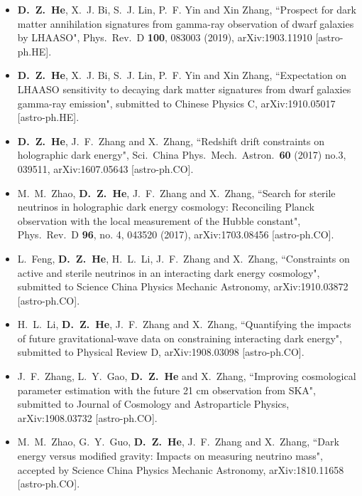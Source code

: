   \begin{itemize}[leftmargin=*]
    
    \item \textbf{D.~Z.~He}, X.~J. Bi, S.~J. Lin, P.~F. Yin and Xin Zhang, ``Prospect for dark matter annihilation signatures from gamma-ray observation of dwarf galaxies by LHAASO", Phys.\ Rev.\ D {\bf 100}, 083003 (2019), arXiv:1903.11910 [astro-ph.HE].
    
    \item \textbf{D.~Z.~He}, X.~J. Bi, S.~J. Lin, P.~F. Yin and Xin Zhang, ``Expectation on LHAASO sensitivity to decaying dark matter signatures from dwarf galaxies gamma-ray emission", submitted to Chinese Physics C, arXiv:1910.05017 [astro-ph.HE].
          
    \item \textbf{D.~Z.~He}, J.~F.~Zhang and X.~Zhang, ``Redshift drift constraints on holographic dark energy", Sci.\ China Phys.\ Mech.\ Astron.\  {\bf 60} (2017) no.3, 039511, arXiv:1607.05643 [astro-ph.CO].   

    \item  M.~M.~Zhao, \textbf{D.~Z.~He}, J.~F.~Zhang and X.~Zhang, ``Search for sterile neutrinos in holographic dark energy cosmology: Reconciling Planck observation with the local measurement of the Hubble constant", Phys.\ Rev.\ D {\bf 96}, no. 4, 043520 (2017), arXiv:1703.08456 [astro-ph.CO].          

    \item L.~Feng, {\bf D.~Z.~He}, H.~L.~Li, J.~F.~Zhang and X.~Zhang, ``Constraints on active and sterile neutrinos in an interacting dark energy cosmology", submitted to Science China Physics Mechanic Astronomy, arXiv:1910.03872 [astro-ph.CO].

    \item H.~L.~Li, \textbf{D.~Z.~He}, J.~F.~Zhang and X.~Zhang, ``Quantifying the impacts of future gravitational-wave data on constraining interacting dark energy", submitted to Physical Review D, arXiv:1908.03098 [astro-ph.CO].


    \item J.~F.~Zhang, L.~Y.~Gao, \textbf{D.~Z.~He} and X.~Zhang, ``Improving cosmological parameter estimation with the future 21 cm observation from SKA", submitted to Journal of Cosmology and Astroparticle Physics, arXiv:1908.03732 [astro-ph.CO].
     
    \item  M.~M.~Zhao, G.~Y.~Guo, \textbf{D.~Z.~He}, J.~F.~Zhang and X.~Zhang, ``Dark energy versus modified gravity: Impacts on measuring neutrino mass", accepted by Science China Physics Mechanic Astronomy, arXiv:1810.11658 [astro-ph.CO].
 

\end{itemize}
